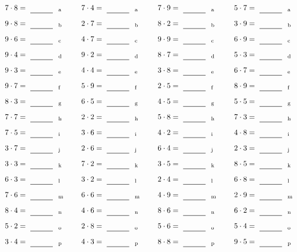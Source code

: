 \documentclass
[
  draft    = true,
  fontsize = 11pt,
  parskip  = half-
]
{scrartcl}
\begin{document}
\par\vfill\par
\begin{align*}
    \pline{7\cdot8}&=\rline{a}
  & \pline{7\cdot4}&=\rline{a}
  & \pline{7\cdot9}&=\rline{a}
  & \pline{5\cdot7}&=\rline{a} \\[1ex]
    \pline{9\cdot8}&=\rline{b}
  & \pline{2\cdot7}&=\rline{b}
  & \pline{8\cdot2}&=\rline{b}
  & \pline{3\cdot9}&=\rline{b} \\[1ex]
    \pline{9\cdot6}&=\rline{c}
  & \pline{4\cdot7}&=\rline{c}
  & \pline{9\cdot9}&=\rline{c}
  & \pline{6\cdot9}&=\rline{c} \\[1ex]
    \pline{9\cdot4}&=\rline{d}
  & \pline{9\cdot2}&=\rline{d}
  & \pline{8\cdot7}&=\rline{d}
  & \pline{5\cdot3}&=\rline{d} \\[1ex]
    \pline{9\cdot3}&=\rline{e}
  & \pline{4\cdot4}&=\rline{e}
  & \pline{3\cdot8}&=\rline{e}
  & \pline{6\cdot7}&=\rline{e} \\[1ex]
    \pline{9\cdot7}&=\rline{f}
  & \pline{5\cdot9}&=\rline{f}
  & \pline{2\cdot5}&=\rline{f}
  & \pline{8\cdot9}&=\rline{f} \\[1ex]
    \pline{8\cdot3}&=\rline{g}
  & \pline{6\cdot5}&=\rline{g}
  & \pline{4\cdot5}&=\rline{g}
  & \pline{5\cdot5}&=\rline{g} \\[1ex]
    \pline{7\cdot7}&=\rline{h}
  & \pline{2\cdot2}&=\rline{h}
  & \pline{5\cdot8}&=\rline{h}
  & \pline{7\cdot3}&=\rline{h} \\[1ex]
    \pline{7\cdot5}&=\rline{i}
  & \pline{3\cdot6}&=\rline{i}
  & \pline{4\cdot2}&=\rline{i}
  & \pline{4\cdot8}&=\rline{i} \\[1ex]
    \pline{3\cdot7}&=\rline{j}
  & \pline{2\cdot6}&=\rline{j}
  & \pline{6\cdot4}&=\rline{j}
  & \pline{2\cdot3}&=\rline{j} \\[1ex]
    \pline{3\cdot3}&=\rline{k}
  & \pline{7\cdot2}&=\rline{k}
  & \pline{3\cdot5}&=\rline{k}
  & \pline{8\cdot5}&=\rline{k} \\[1ex]
    \pline{6\cdot3}&=\rline{l}
  & \pline{3\cdot2}&=\rline{l}
  & \pline{2\cdot4}&=\rline{l}
  & \pline{6\cdot8}&=\rline{l} \\[1ex]
    \pline{7\cdot6}&=\rline{m}
  & \pline{6\cdot6}&=\rline{m}
  & \pline{4\cdot9}&=\rline{m}
  & \pline{2\cdot9}&=\rline{m} \\[1ex]
    \pline{8\cdot4}&=\rline{n}
  & \pline{4\cdot6}&=\rline{n}
  & \pline{8\cdot6}&=\rline{n}
  & \pline{6\cdot2}&=\rline{n} \\[1ex]
    \pline{5\cdot2}&=\rline{o}
  & \pline{2\cdot8}&=\rline{o}
  & \pline{5\cdot6}&=\rline{o}
  & \pline{5\cdot4}&=\rline{o} \\[1ex]
    \pline{3\cdot4}&=\rline{p}
  & \pline{4\cdot3}&=\rline{p}
  & \pline{8\cdot8}&=\rline{p}
  & \pline{9\cdot5}&=\rline{p}
\end{align*}
\end{document}
